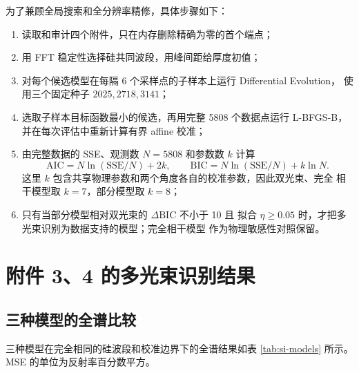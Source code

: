 \documentclass[UTF8,12pt,a4paper]{ctexart}
\begin{document}
为了兼顾全局搜索和全分辨率精修，具体步骤如下：

\begin{enumerate}[label=步骤\arabic*：,leftmargin=5em]
  \item 读取和审计四个附件，只在内存删除精确为零的首个端点；
  \item 用 FFT 稳定性选择硅共同波段，用峰间距给厚度初值；
  \item 对每个候选模型在每隔 6 个采样点的子样本上运行 Differential Evolution，
  使用三个固定种子 $2025,2718,3141$；
  \item 选取子样本目标函数最小的候选，再用完整 5808 个数据点运行
  L-BFGS-B，并在每次评估中重新计算有界 affine 校准；
  \item 由完整数据的 SSE、观测数 $N=5808$ 和参数数 $k$ 计算
  \begin{equation}
    \mathrm{AIC}=N\ln(\mathrm{SSE}/N)+2k,\qquad
    \mathrm{BIC}=N\ln(\mathrm{SSE}/N)+k\ln N.
    \label{eq:bic}
  \end{equation}
  这里 $k$ 包含共享物理参数和两个角度各自的校准参数，因此双光束、完全
  相干模型取 $k=7$，部分模型取 $k=8$；
  \item 只有当部分模型相对双光束的 $\Delta\mathrm{BIC}$ 不小于 10 且
  拟合 $\eta\ge0.05$ 时，才把多光束识别为数据支持的模型；完全相干模型
  作为物理敏感性对照保留。
\end{enumerate}

\section{附件 3、4 的多光束识别结果}

\subsection{三种模型的全谱比较}

三种模型在完全相同的硅波段和校准边界下的全谱结果如表
\ref{tab:si-models} 所示。MSE 的单位为反射率百分数平方。

\begin{table}[H]
  \centering
  \caption{附件 3、4 联合拟合的模型比较}
  \label{tab:si-models}
  \small
  \setlength{\tabcolsep}{3pt}
\end{table}
\end{document}
